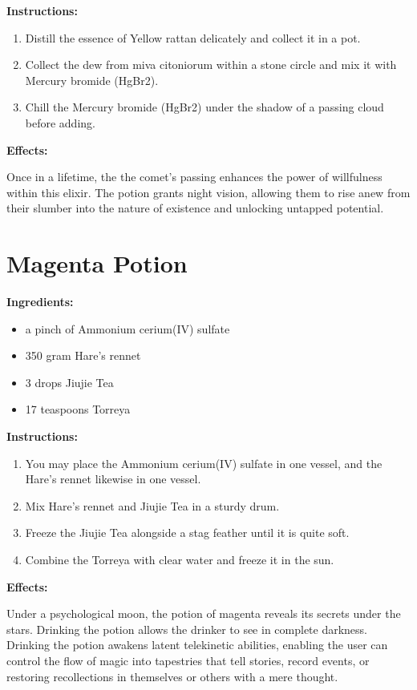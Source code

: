\documentclass{article}
\begin{document}
\textbf{Instructions:}

\begin{enumerate}
  \item Distill the essence of Yellow rattan delicately and collect it in a pot.
  \item Collect the dew from miva citoniorum within a stone circle and mix it with Mercury bromide (HgBr2).
  \item Chill the Mercury bromide (HgBr2) under the shadow of a passing cloud before adding.
\end{enumerate}

\textbf{Effects:}

Once in a lifetime, the the comet’s passing enhances the power of willfulness within this elixir. The potion grants night vision, allowing them to rise anew from their slumber into the nature of existence and unlocking untapped potential.

\newpage
\section*{Magenta Potion}

\textbf{Ingredients:}

\begin{itemize}
  \item a pinch of Ammonium cerium(IV) sulfate
  \item 350 gram Hare's rennet
  \item 3 drops Jiujie Tea
  \item 17 teaspoons Torreya
\end{itemize}

\textbf{Instructions:}

\begin{enumerate}
  \item You may place the Ammonium cerium(IV) sulfate in one vessel, and the Hare's rennet likewise in one vessel.
  \item Mix Hare's rennet and Jiujie Tea in a sturdy drum.
  \item Freeze the Jiujie Tea alongside a stag feather until it is quite soft.
  \item Combine the Torreya with clear water and freeze it in the sun.
\end{enumerate}

\textbf{Effects:}

Under a psychological moon, the potion of magenta reveals its secrets under the stars. Drinking the potion allows the drinker to see in complete darkness. Drinking the potion awakens latent telekinetic abilities, enabling the user can control the flow of magic into tapestries that tell stories, record events, or restoring recollections in themselves or others with a mere thought.
\end{document}
